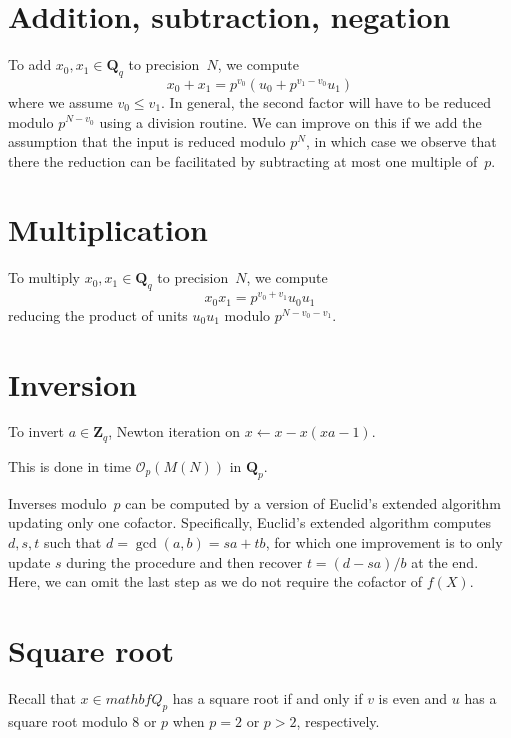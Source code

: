 \documentclass[a4paper,11pt]{article}
\theoremstyle{definition}
\begin{document}
\section{Addition, subtraction, negation}

To add $x_0, x_1 \in \mathbf{Q}_q$ to precision~$N$, we compute 
\begin{equation}
x_0 + x_1 = p^{v_0} (u_0 + p^{v_1 - v_0} u_1)
\end{equation}
where we assume $v_0 \leq v_1$.  In general, the second factor 
will have to be reduced modulo $p^{N - v_0}$ using a division 
routine.  We can improve on this if we add the assumption that 
the input is reduced modulo $p^N$, in which case we observe that 
there the reduction can be facilitated by subtracting at most 
one multiple of~$p$.

\section{Multiplication}

To multiply $x_0, x_1 \in \mathbf{Q}_q$ to precision~$N$, we compute 
\begin{equation}
x_0 x_1 = p^{v_0 + v_1} u_0 u_1
\end{equation}
reducing the product of units $u_0 u_1$ modulo $p^{N - v_0 - v_1}$.

\section{Inversion}

To invert $a \in \mathbf{Z}_q$, Newton iteration on $x \gets x - x (x a - 1)$.

This is done in time $\mathcal{O}_p(M(N))$ in $\mathbf{Q}_p$.

Inverses modulo~$p$ can be computed by a version of Euclid's extended 
algorithm updating only one cofactor.  Specifically, Euclid's extended 
algorithm computes $d,s,t$ such that $d = \gcd(a,b) = sa + tb$, for 
which one improvement is to only update $s$ during the procedure and 
then recover $t = (d - sa)/b$ at the end.  Here, we can omit the last 
step as we do not require the cofactor of $f(X)$.

\section{Square root}

Recall that $x \in mathbf{Q}_p$ has a square root if and only if $v$ is even 
and $u$ has a square root modulo $8$ or $p$ when $p = 2$ or $p > 2$, respectively.
\end{document}
